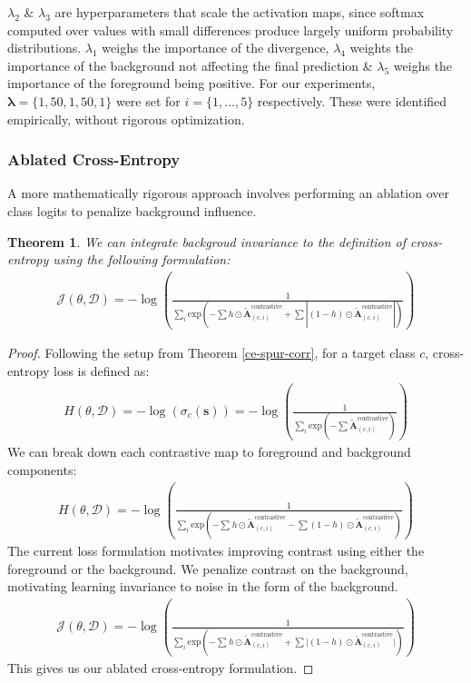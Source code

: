 \documentclass{article}
\theoremstyle{plain}
\newtheorem{theorem}{Theorem}[section]
\theoremstyle{definition}
\theoremstyle{remark}
\begin{document}
$\lambda_2$ \& $\lambda_3$ are hyperparameters that scale the activation maps, since softmax computed over values with small differences produce largely uniform probability distributions. $\lambda_1$ weighs the importance of the divergence, $\lambda_4$ weights the importance of the background not affecting the final prediction \& $\lambda_5$ weighs the importance of the foreground being positive. For our experiments, $\bm{\lambda} = \{1, 50, 1, 50, 1\}$ were set for $i = \{1, \ldots, 5\}$ respectively. These were identified empirically, without rigorous optimization.

\subsubsection{Ablated Cross-Entropy}

A more mathematically rigorous approach involves performing an ablation over class logits to penalize background influence.

\begin{theorem}\label{ace}
	We can integrate backgroud invariance to the definition of cross-entropy using the following formulation:
	\begin{gather}
		\mathcal{J}(\theta, \mathcal{D}) = -\log \left( \frac{1}{\sum_i \text{exp}\left(-\sum h \odot \tilde{\mathcal{\bm{A}}}^{\text{contrastive}}_{(c, i)} + \sum |(1-h) \odot \tilde{\mathcal{\bm{A}}}^{\text{contrastive}}_{(c, i)}|\right)} \right)
	\end{gather}
\end{theorem}
\begin{proof} Following the setup from Theorem \ref{ce-spur-corr}, for a target class $c$, cross-entropy loss is defined as:
	\begin{gather}
		H(\theta, \mathcal{D}) = -\log \left( \sigma_c(\bm{s}) \right) = -\log \left( \frac{1}{\sum_i \text{exp}({-\sum^{}\tilde{\mathcal{\bm{A}}}^{\text{contrastive}}_{(c, i)}})} \right)
	\end{gather}
	We can break down each contrastive map to foreground and background components:
	\begin{gather}
		H(\theta, \mathcal{D}) = -\log \left( \frac{1}{\sum_i \text{exp}\left({-\sum^{}h \odot \tilde{\mathcal{\bm{A}}}^{\text{contrastive}}_{(c, i)} - \sum (1-h) \odot \tilde{\mathcal{\bm{A}}}^{\text{contrastive}}_{(c, i)}}\right)} \right)
	\end{gather}
	The current loss formulation motivates improving contrast using either the foreground or the background. We penalize contrast on the background, motivating learning invariance to noise in the form of the background.
	\begin{gather}
		\mathcal{J}(\theta, \mathcal{D}) = -\log \left( \frac{1}{\sum_i \text{exp}\left({-\sum^{}h \odot \tilde{\mathcal{\bm{A}}}^{\text{contrastive}}_{(c, i)} + \sum |(1-h) \odot \tilde{\mathcal{\bm{A}}}^{\text{contrastive}}_{(c, i)}}|\right)} \right)
	\end{gather}
	This gives us our ablated cross-entropy formulation.
\end{proof}
\end{document}

